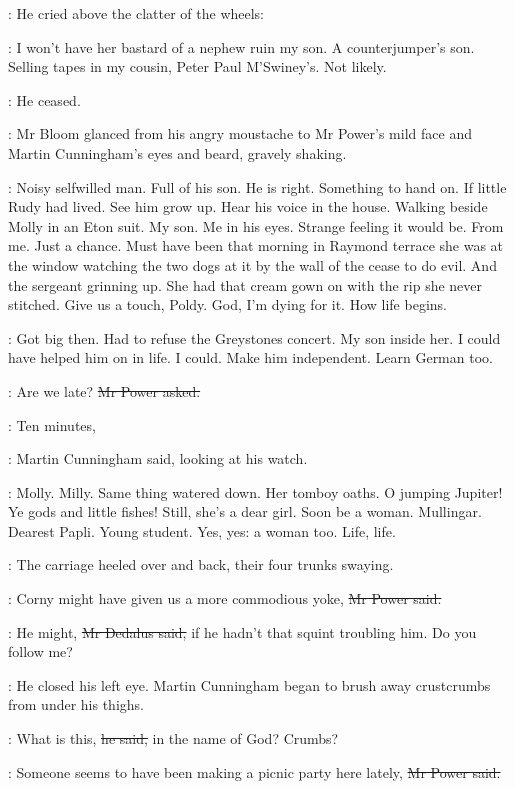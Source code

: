 :
He cried above the clatter of the wheels:

\simon:
I won't have her bastard of a nephew ruin my son.
A counterjumper's son.
Selling tapes in my cousin, Peter Paul M'Swiney's.
Not likely.

:
He ceased.

:
Mr Bloom glanced from his angry moustache
to Mr Power's mild face
and Martin Cunningham's eyes and beard,
gravely shaking.

\BloomInt:
Noisy selfwilled man.
Full of his son.
He is right.
Something to hand on.
If little Rudy had lived.
See him grow up.
Hear his voice in the house.
Walking beside Molly in an Eton suit.
My son.
Me in his eyes.
Strange feeling it would be.
From me.
Just a chance.
Must have been that morning in Raymond terrace
she was at the window watching the two dogs at it
by the wall of the cease to do evil.
And the sergeant grinning up.
She had that cream gown on with the rip she never stitched.
Give us a touch, Poldy.
God, I'm dying for it.
How life begins.

\BloomInt:
Got big then.
Had to refuse the Greystones concert.
My son inside her.
I could have helped him on in life.
I could.
Make him independent.
Learn German too.

\power:
Are we late?
\sout{Mr Power asked.}

\cunningham:
Ten minutes,

:
Martin Cunningham said, looking at his watch.

\BloomInt:
Molly.
Milly.
Same thing watered down.
Her tomboy oaths.
O jumping Jupiter!
Ye gods and little fishes!
Still, she's a dear girl.
Soon be a woman.
Mullingar.
Dearest Papli.
Young student.
Yes, yes:
a woman too.
Life,
life.

:
The carriage heeled over and back,
their four trunks swaying.

\power:
Corny might have given us a more commodious yoke,
\sout{Mr Power said.}

\simon:
He might,
\sout{Mr Dedalus said,}
if he hadn't that squint troubling him.
Do you follow me?

:
He closed his left eye.
Martin Cunningham began to brush away crustcrumbs from under his thighs.

\cunningham:
What is this,
\sout{he said,}
in the name of God?
Crumbs?

\power:
Someone seems to have been making a picnic party here lately,
\sout{Mr Power said.}

